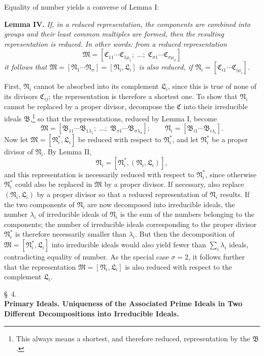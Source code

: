 \documentclass[11pt]{article}
\providecommand{\ideal}[1]{\mathfrak{#1}}
\begin{document}
Equality of number yields a converse of Lemma I:

\textbf{Lemma IV.} \emph{If, in a reduced representation, the components are combined into groups and their least common multiples are formed, then the resulting representation is reduced. In other words: from a reduced representation}
\[
 \ideal M=[\ideal C_{11}\cdots\ideal C_{1\mu_1};\;\ldots;\;
 \ideal C_{\sigma1}\cdots\ideal C_{\sigma\mu_\sigma}]
\]
\emph{it follows that $\ideal M=[\ideal N_1\cdots\ideal N_\sigma]=[\ideal N_i,\ideal L_i]$ is also reduced, if $\ideal N_i=[\ideal C_{i1}\cdots\ideal C_{i\mu_i}]$.}

First, $\ideal N_i$ cannot be absorbed into its complement $\ideal L_i$, since this is true of none of its divisors $\ideal C_{ij}$; the representation is therefore a shortest one. To show that $\ideal N_i$ cannot be replaced by a proper divisor, decompose the $\ideal C$ into their irreducible ideals $\ideal B$,\footnote{This always means a shortest, and therefore reduced, representation by the $\ideal B$.} so that the representations, reduced by Lemma I, become
\[
 \ideal M=[\ideal B_{11}\cdots\ideal B_{1\lambda_1};\;\ldots;\;
 \ideal B_{\sigma1}\cdots\ideal B_{\sigma\lambda_\sigma}];
 \qquad
 \ideal N_i=[\ideal B_{i1}\cdots\ideal B_{i\lambda_i}].
\]
Now let $\ideal M=[\ideal N_i^*,\ideal L_i]$ be reduced with respect to $\ideal N_i^*$, and let $\ideal N_i^*$ be a proper divisor of $\ideal N_i$. By Lemma II,
\[
 \ideal N_i=[\ideal N_i^*,(\ideal N_i,\ideal L_i)],
\]
and this representation is necessarily reduced with respect to $\ideal N_i^*$, since otherwise $\ideal N_i^*$ could also be replaced in $\ideal M$ by a proper divisor. If necessary, also replace $(\ideal N_i,\ideal L_i)$ by a proper divisor so that a reduced representation of $\ideal N_i$ results. If the two components of $\ideal N_i$ are now decomposed into irreducible ideals, the number $\lambda_i$ of irreducible ideals of $\ideal N_i$ is the sum of the numbers belonging to the components; the number of irreducible ideals corresponding to the proper divisor $\ideal N_i^*$ is therefore necessarily smaller than $\lambda_i$. But then the decomposition of $\ideal M=[\ideal N_i^*,\ideal L_i]$ into irreducible ideals would also yield fewer than $\sum_i\lambda_i$ ideals, contradicting equality of number. As the special case $\sigma=2$, it follows further that the representation $\ideal M=[\ideal N_i,\ideal L_i]$ is also reduced with respect to the complement $\ideal L_i$.

\begin{center}
\S~4.\\[0.25em]
\textbf{Primary Ideals. Uniqueness of the Associated Prime Ideals in Two Different Decompositions into Irreducible Ideals.}
\end{center}
\end{document}
